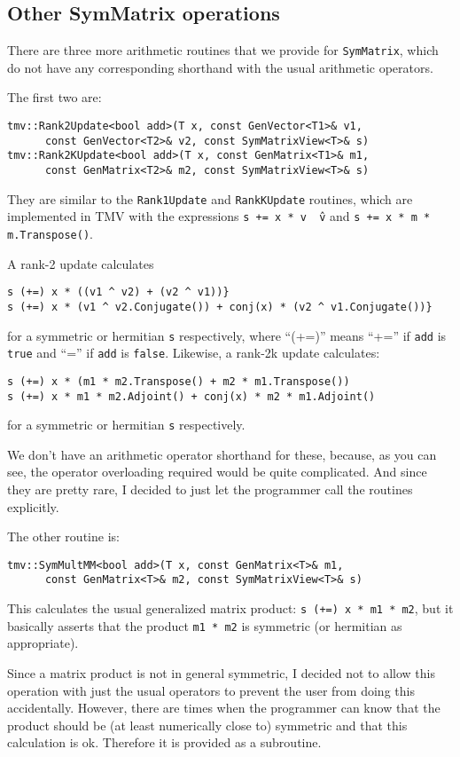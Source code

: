 \documentclass[twoside,letterpaper,11pt]{article}
\renewcommand{\tt}[1]{{\texttt {#1}}}
\begin{document}
\subsection{Other SymMatrix operations}

There are three more arithmetic routines that we provide for \tt{SymMatrix},
which do not have
any corresponding shorthand with the usual arithmetic operators.

The first two are:
\begin{verbatim}
tmv::Rank2Update<bool add>(T x, const GenVector<T1>& v1, 
      const GenVector<T2>& v2, const SymMatrixView<T>& s)
tmv::Rank2KUpdate<bool add>(T x, const GenMatrix<T1>& m1, 
      const GenMatrix<T2>& m2, const SymMatrixView<T>& s)
\end{verbatim}
They are similar to the \tt{Rank1Update} and \tt{RankKUpdate} routines,
which are implemented in TMV with the expressions 
\tt{s += x * v \^\ v} and \tt{s += x * m * m.Transpose()}.

A rank-2 update calculates
\begin{verbatim}
s (+=) x * ((v1 ^ v2) + (v2 ^ v1))} 
s (+=) x * (v1 ^ v2.Conjugate()) + conj(x) * (v2 ^ v1.Conjugate())}
\end{verbatim}
for a symmetric or hermitian \tt{s} respectively,
where ``(+=)'' means ``+='' if \tt{add} is \tt{true} and ``='' 
if \tt{add} is \tt{false}.
Likewise, a rank-2k update calculates:
\begin{verbatim}
s (+=) x * (m1 * m2.Transpose() + m2 * m1.Transpose())
s (+=) x * m1 * m2.Adjoint() + conj(x) * m2 * m1.Adjoint()
\end{verbatim}
for a symmetric or hermitian \tt{s} respectively.

We don't have an arithmetic operator 
shorthand for these, because, as you can see, the operator
overloading required would be quite complicated.  
And since they are pretty rare, I decided to just let the programmer 
call the routines explicitly.

The other routine is:
\begin{verbatim}
tmv::SymMultMM<bool add>(T x, const GenMatrix<T>& m1, 
      const GenMatrix<T>& m2, const SymMatrixView<T>& s)
\end{verbatim}
This calculates the usual generalized matrix product:
\tt{s (+=) x * m1 * m2}, but it basically
asserts that the product \tt{m1 * m2} is symmetric (or hermitian as appropriate).

Since a matrix product is not in general symmetric, I decided not to allow 
this operation with just the usual operators to prevent the user from doing 
this accidentally.  However, there are times when the 
programmer can know that the product should be (at least numerically close to)
symmetric and that this calculation is ok.  Therefore it is provided as a subroutine.
\end{document}
